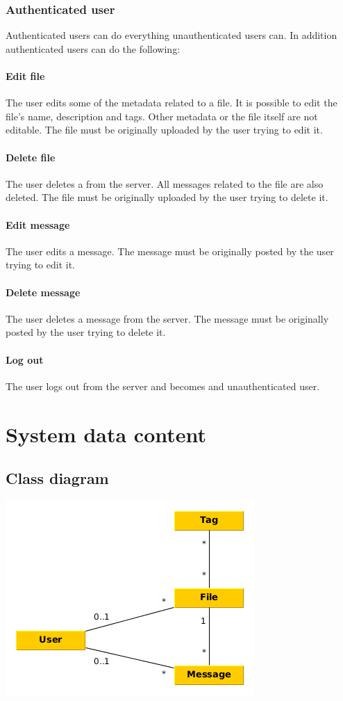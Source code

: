 \documentclass[10pt,a4paper]{article}
\begin{document}
\subsubsection{Authenticated user}
Authenticated users can do everything unauthenticated users can. In addition authenticated users can do the following:
\paragraph{Edit file}
The user edits some of the metadata related to a file. It is possible to edit the file's name, description and tags. Other metadata or the file itself are not editable. The file must be originally uploaded by the user trying to edit it.
\paragraph{Delete file}
The user deletes a from the server. All messages related to the file are also deleted. The file must be originally uploaded by the user trying to delete it.

\paragraph{Edit message}
The user edits a message. The message must be originally posted by the user trying to edit it.
\paragraph{Delete message}
The user deletes a message from the server. The message must be originally posted by the user trying to delete it.

\paragraph{Log out}
The user logs out from the server and becomes and unauthenticated user.

\section{System data content}
\subsection{Class diagram}
\includegraphics[scale=0.7]{diagrams/class.png}
\end{document}
